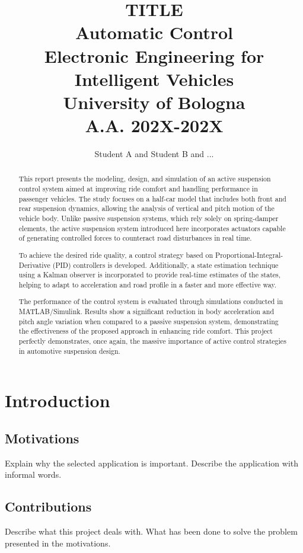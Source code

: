 \documentclass[]{report}
\title{{\huge  TITLE} \\
	{\small Automatic Control\\
		Electronic Engineering for Intelligent Vehicles\\
		University of Bologna\\
		A.A. 202X-202X}}
\author{Student A and Student B and ...}
\begin{document}
	\maketitle
	
	\begin{abstract}
		This report presents the modeling, design, and simulation of an active suspension control system aimed at improving ride comfort and handling performance in passenger vehicles. The study focuses on a half-car model that includes both front and rear suspension dynamics, allowing the analysis of vertical and pitch motion of the vehicle body. Unlike passive suspension systems, which rely solely on spring-damper elements, the active suspension system introduced here incorporates actuators capable of generating controlled forces to counteract road disturbances in real time.
		
		To achieve the desired ride quality, a control strategy based on Proportional-Integral-Derivative (PID) controllers is developed.  Additionally, a state estimation technique using a Kalman observer is incorporated to provide real-time estimates of the states, helping to adapt to acceleration and road profile in a faster and more effective way.
		
		The performance of the control system is evaluated through simulations conducted in MATLAB/Simulink. Results show a significant reduction in body acceleration and pitch angle variation when compared to a passive suspension system, demonstrating the effectiveness of the proposed approach in enhancing ride comfort. This project perfectly demonstrates, once again, the massive importance of active control strategies in automotive suspension design.
	\end{abstract}
	
	\chapter{Introduction}
	\section{Motivations}
	Explain why the selected application is important. Describe the application with informal words.
	
	\section{Contributions}
	Describe what this project deals with. What has been done to solve the problem presented in the motivations.
	
\end{document}
